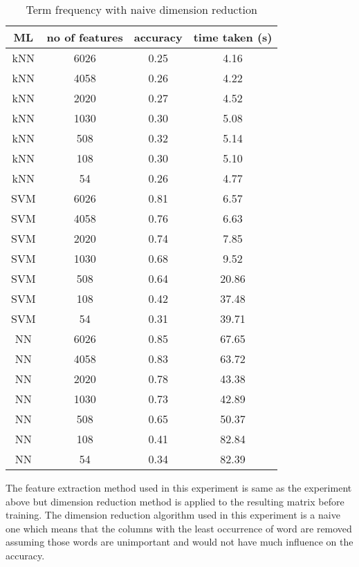\begin{table} [h]
	\centering
	\caption{Term frequency with naive dimension reduction}
	\label{tbl:termFrequencyNaive}
	\begin{tabular}{|| c | c | c | c ||}
		\hline
		ML & no of features & accuracy & time taken (s) \\ [0.5ex]
		\hline\hline
		kNN & 6026 & 0.25 & 4.16 \\ 
		\hline
		kNN & 4058 & 0.26 & 4.22 \\ 
		\hline
		kNN & 2020 & 0.27 & 4.52 \\ 
		\hline
		kNN & 1030 & 0.30 & 5.08 \\ 
		\hline
		kNN & 508 & 0.32 & 5.14 \\ 
		\hline
		kNN & 108 & 0.30 & 5.10 \\ 
		\hline
		kNN & 54 & 0.26 & 4.77 \\ 
		\hline\hline
		SVM & 6026 & 0.81 & 6.57 \\
		\hline
		SVM & 4058 & 0.76 & 6.63 \\
		\hline
		SVM & 2020 & 0.74 & 7.85 \\
		\hline
		SVM & 1030 & 0.68 & 9.52 \\
		\hline
		SVM & 508 & 0.64 & 20.86 \\
		\hline
		SVM & 108 & 0.42 & 37.48 \\
		\hline
		SVM & 54 & 0.31 & 39.71 \\
		\hline\hline
		NN & 6026 & 0.85 & 67.65 \\
		\hline
		NN & 4058 & 0.83 & 63.72 \\
		\hline
		NN & 2020 & 0.78 & 43.38 \\
		\hline
		NN & 1030 & 0.73 & 42.89 \\
		\hline
		NN & 508 & 0.65 & 50.37 \\
		\hline
		NN & 108 & 0.41 & 82.84 \\
		\hline
		NN & 54 & 0.34 & 82.39 \\
		\hline
	\end{tabular}
\end{table}

The feature extraction method used in this experiment is same as the experiment above but dimension reduction method is applied to the resulting matrix before training. The dimension reduction algorithm used in this experiment is a naive one which means that the columns with the least occurrence of word are removed assuming those words are unimportant and would not have much influence on the accuracy.

